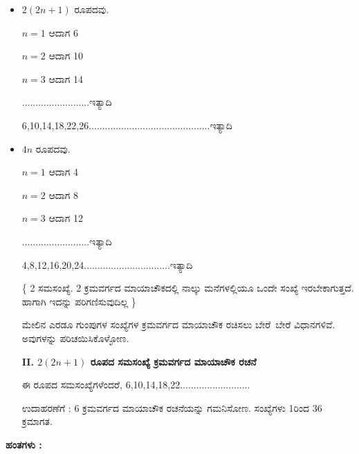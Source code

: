 \begin{itemize}
	\item $2 (2n+1)$ ರೂಪದವು.

	$n=1$ ಆದಾಗ 6

	$n=2$ ಆದಾಗ 10

	$n=3$ ಆದಾಗ 14

	.........................ಇತ್ಯಾದಿ

	6,10,14,18,22,26.............................................ಇತ್ಯಾದಿ
	\item $4n$ ರೂಪದವು. 

	$n=1$ ಆದಾಗ 4

	$n=2$ ಆದಾಗ 8

	$n=3$ ಆದಾಗ 12

	.........................ಇತ್ಯಾದಿ

	4,8,12,16,20,24................................ಇತ್ಯಾದಿ

	\{ 2 ಸಮಸಂಖ್ಯೆ. 2 ಕ್ರಮವರ್ಗದ ಮಾಯಾಚೌಕದಲ್ಲಿ ನಾಲ್ಕು ಮನೆಗಳಲ್ಲಿಯೂ ಒಂದೇ ಸಂಖ್ಯೆ ಇರಬೇಕಾಗುತ್ತದೆ. ಹಾಗಾಗಿ ಇದನ್ನು ಪರಿಗಣಿಸುವುದಿಲ್ಲ \}

	ಮೇಲಿನ ಎರಡೂ ಗುಂಪುಗಳ ಸಂಖ್ಯೆಗಳ ಕ್ರಮವರ್ಗದ ಮಾಯಾಚೌಕ ರಚಿಸಲು \hbox{ಬೇರೆ ಬೇರೆ} ವಿಧಾನಗಳಿವೆ. ಅವುಗಳನ್ನು ಪರಿಚಯಿಸಿಕೊಳ್ಳೋಣ.

	\textbf{II. $2 (2n+1)$ ರೂಪದ ಸಮಸಂಖ್ಯೆ  ಕ್ರಮವರ್ಗದ ಮಾಯಾಚೌಕ ರಚನೆ}

	ಈ ರೂಪದ ಸಮಸಂಖ್ಯೆಗಳೆಂದರೆ, 6,10,14,18,22..........................

	ಉದಾಹರಣೆಗೆ : 6 ಕ್ರಮವರ್ಗದ ಮಾಯಾಚೌಕ ರಚನೆಯನ್ನು ಗಮನಿಸೋಣ. ಸಂಖ್ಯೆ\-ಗಳು 1ರಿಂದ 36 ಕ್ರಮಾಗತ.
\end{itemize}

\noindent \textbf{ಹಂತಗಳು :}

